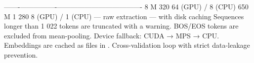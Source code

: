 {}\markdownRendererPipe{}-------\markdownRendererPipe{}----------------\markdownRendererPipe{}---------------\markdownRendererPipe{}----------------------\markdownRendererPipe{}\markdownRendererSoftLineBreak
{}\markdownRendererPipe{}  \markdownRendererPipe{} 8 M \markdownRendererPipe{} 320 \markdownRendererPipe{} 64 (GPU) / 8 (CPU) \markdownRendererPipe{}\markdownRendererSoftLineBreak
{}\markdownRendererPipe{}  \markdownRendererPipe{} 650 M \markdownRendererPipe{} 1 280 \markdownRendererPipe{} 8 (GPU) / 1 (CPU) \markdownRendererPipe{}\markdownRendererParagraphSeparator
{}\markdownRendererInterblockSeparator
{}\markdownRendererUlBeginTight
\markdownRendererUlItem {} — raw extraction\markdownRendererUlItemEnd 
\markdownRendererUlItem {} — with disk caching\markdownRendererUlItemEnd 
\markdownRendererUlEndTight \markdownRendererInterblockSeparator
{}\markdownRendererInterblockSeparator
{}\markdownRendererOlBeginTight
{}Sequences longer than 1 022 tokens are truncated with a warning.\markdownRendererOlItemEnd 
{}BOS/EOS tokens are excluded from mean-pooling.\markdownRendererOlItemEnd 
{}Device fallback: CUDA → MPS → CPU.\markdownRendererOlItemEnd 
{}Embeddings are cached as  files in .\markdownRendererOlItemEnd 
\markdownRendererOlEndTight \markdownRendererInterblockSeparator
{}\markdownRendererThematicBreak{}\markdownRendererInterblockSeparator
{}
\markdownRendererSectionEnd \markdownRendererSectionBegin
{}\markdownRendererInterblockSeparator
{} Cross-validation loop with strict data-leakage prevention.\markdownRendererInterblockSeparator
